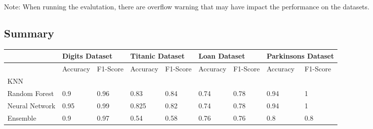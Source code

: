 \documentclass[letterpaper]{article}
\begin{document}
Note: When running the evalutation, there are overflow warning that may have impact the performance on the datasets.

\subsection*{Summary}

\begin{table}[]
	\centering
	\begin{tabular}{|l|ll|ll|ll|ll|}
		\hline
		               & \multicolumn{2}{l|}{Digits Dataset} & \multicolumn{2}{l|}{Titanic Dataset} & \multicolumn{2}{l|}{Loan Dataset} & \multicolumn{2}{l|}{Parkinsons Dataset}                                                                                       \\ \hline
		               & \multicolumn{1}{l|}{Accuracy}       & F1-Score                             & \multicolumn{1}{l|}{Accuracy}     & F1-Score                                & \multicolumn{1}{l|}{Accuracy} & F1-Score & \multicolumn{1}{l|}{Accuracy} & F1-Score \\ \hline
		KNN            & \multicolumn{1}{l|}{}               &                                      & \multicolumn{1}{l|}{}             &                                         & \multicolumn{1}{l|}{}         &          & \multicolumn{1}{l|}{}         &          \\ \hline
		Random Forest  & \multicolumn{1}{l|}{0.9}            & 0.96                                 & \multicolumn{1}{l|}{0.83}         & 0.84                                    & \multicolumn{1}{l|}{0.74}     & 0.78     & \multicolumn{1}{l|}{0.94}     & 1        \\ \hline
		Neural Network & \multicolumn{1}{l|}{0.95}           & 0.99                                 & \multicolumn{1}{l|}{0.825}        & 0.82                                    & \multicolumn{1}{l|}{0.74}     & 0.78     & \multicolumn{1}{l|}{0.94}     & 1        \\ \hline
		Ensemble       & \multicolumn{1}{l|}{0.9}            & 0.97                                 & \multicolumn{1}{l|}{0.54}         & 0.58                                    & \multicolumn{1}{l|}{0.76}     & 0.76     & \multicolumn{1}{l|}{0.8}      & 0.8      \\ \hline
	\end{tabular}
\end{table}
\end{document}
